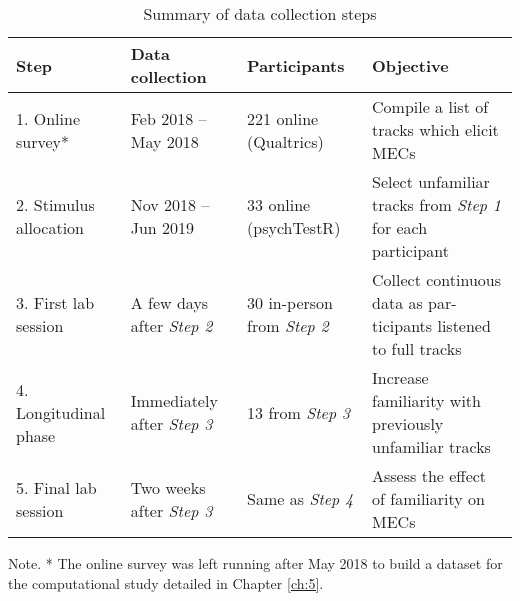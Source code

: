 \begin{table}[t!]
\centering
\scriptsize
\def\arraystretch{1.2}

\begin{threeparttable}
\caption{Summary of data collection steps}
\label{tab:con-1}

\begin{tabular*}{\textwidth}{
    >{\raggedright}p{}
    >{\raggedright}p{}
    >{\raggedright}p{}
    >{\raggedright\arraybackslash}p{}}

\hline

\textbf{Step} & \textbf{Data collection} & \textbf{Participants} & \textbf{Objective} \\ 

\hline
1. Online survey* & 
    Feb 2018 – \newline May 2018 &
    221 online (Qualtrics) & 
    Compile a list of tracks which \newline elicit MECs \\

\hline
2. Stimulus allocation & 
    Nov 2018 – \newline  Jun 2019 &
    33 online (psychTestR) & 
    Select unfamiliar tracks from \newline \emph{Step 1} for each participant \\

\hline
3. First lab session & 
    A few days \newline after \emph{Step 2} &
    30 in-person from \emph{Step 2} & 
    Collect continuous data as par- \newline ticipants listened to full tracks \\

\hline
4. Longitudinal phase & 
    Immediately after \emph{Step 3} &
    13 from \emph{Step 3} & 
    Increase familiarity with \newline previously unfamiliar tracks \\

\hline
5. Final lab session & 
    Two weeks \newline after \emph{Step 3} &
    Same as \emph{Step 4} & 
    Assess the effect of familiarity \newline on MECs \\
    
\hline

\end{tabular*}
\begin{tablenotes}
\small
\item Note. * The online survey was left running after May 2018 to build a dataset for the computational study detailed in Chapter \ref{ch:5}.
\end{tablenotes}
\end{threeparttable}
\end{table}